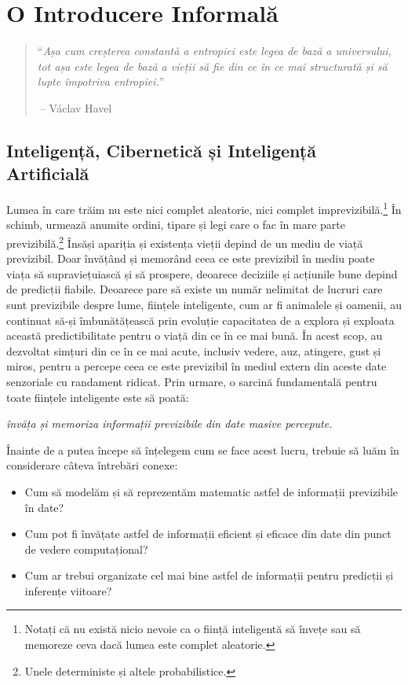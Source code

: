 \documentclass[../../book-main_ro.tex]{subfiles}
\begin{document}
\chapter{O Introducere Informală}
\label{ch:intro}

\begin{quote}
``{\em Așa cum creșterea constantă a entropiei este legea de bază a universului, tot așa este legea de bază a vieții să fie din ce în ce mai structurată și să lupte împotriva entropiei.}''

$~$\hfill -- V\'{a}clav Havel
\end{quote}
\vspace{5mm}



\section{Inteligență, Cibernetică și Inteligență Artificială}
Lumea în care trăim nu este nici complet aleatorie, nici complet imprevizibilă.\footnote{Notați că nu există nicio nevoie ca o ființă inteligentă să învețe sau să memoreze ceva dacă lumea este complet aleatorie.} În schimb, urmează anumite ordini, tipare și legi care o fac în mare parte previzibilă.\footnote{Unele deterministe și altele probabilistice.} Însăși apariția și existența vieții depind de un mediu de viață previzibil. Doar învățând și memorând ceea ce este previzibil în mediu poate viața să supraviețuiască și să prospere, deoarece deciziile și acțiunile bune depind de predicții fiabile. Deoarece pare să existe un număr nelimitat de lucruri care sunt previzibile despre lume, ființele inteligente, cum ar fi animalele și oamenii, au continuat să-și îmbunătățească prin evoluție capacitatea de a explora și exploata această predictibilitate pentru o viață din ce în ce mai bună. În acest scop, au dezvoltat simțuri din ce în ce mai acute, inclusiv vedere, auz, atingere, gust și miros, pentru a percepe ceea ce este previzibil în mediul extern din aceste date senzoriale cu randament ridicat. Prin urmare, o sarcină fundamentală pentru toate ființele inteligente este să poată:
\begin{center}
    {\em învăța și memoriza informații previzibile din date masive percepute.}
\end{center}
Înainte de a putea începe să înțelegem cum se face acest lucru, trebuie să luăm în considerare câteva întrebări conexe:
\begin{itemize}
    \item Cum să modelăm și să reprezentăm matematic astfel de informații previzibile în date?
    \item Cum pot fi învățate astfel de informații eficient și eficace din date din punct de vedere computațional?
    \item Cum ar trebui organizate cel mai bine astfel de informații pentru predicții și inferențe viitoare?
\end{itemize}
\end{document}
